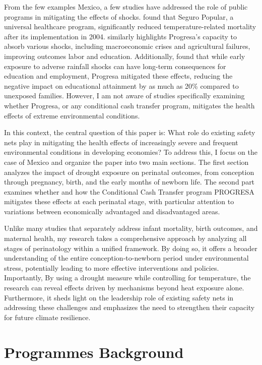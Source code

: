 \documentclass[12pt, oneside]{article}      %
\begin{document}
From the few examples  Mexico, a few studies have addressed the role of public programs in mitigating the effects of shocks. \cite{Cohen2022} found that Seguro Popular, a universal healthcare program, significantly reduced temperature-related mortality after its implementation in 2004. \cite{Parker2017} similarly highlights Progresa's capacity to absorb various shocks, including macroeconomic crises and agricultural failures, improving outcomes labor and education. Additionally, \cite{Adhvaryu2023} found that while early exposure to adverse rainfall shocks can have long-term consequences for education and employment, Progresa mitigated these effects, reducing the negative impact on educational attainment by as much as 20\% compared to unexposed families. However, I am not aware of studies specifically examining whether Progresa, or any conditional cash transfer program, mitigates the health effects of extreme environmental conditions.

In this context, the central question of this paper is: What role do existing safety nets play in mitigating the health effects of increasingly severe and frequent environmental conditions in developing economies? To address this, I focus on the case of Mexico and organize the paper into two main sections. The first section analyzes the impact of drought exposure on perinatal outcomes, from conception through pregnancy, birth, and the early months of newborn life. The second part examines whether and how the Conditional Cash Transfer program PROGRESA mitigates these effects at each perinatal stage, with particular attention to variations between economically advantaged and disadvantaged areas.

Unlike many studies that separately address infant mortality, birth outcomes, and maternal health, my research takes a comprehensive approach by analyzing all stages of perinatology within a unified framework. By doing so, it offers a broader understanding of the entire conception-to-newborn period under environmental stress, potentially leading to more effective interventions and policies. Importantly,  By using a drought measure while controlling for temperature, the research can reveal effects driven by mechanisms beyond heat exposure alone. Furthermore, it sheds light on the leadership role of existing safety nets in addressing these challenges and emphasizes the need to strengthen their capacity for future climate resilience.


\section{Programmes Background}
\end{document}
